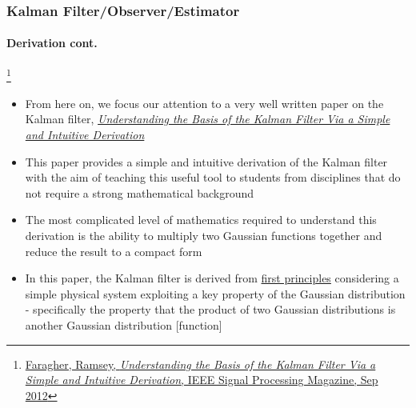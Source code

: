 \begin{frame}
\frametitle{Kalman Filter/Observer/Estimator}
\framesubtitle{Derivation \tiny cont.}

\footnote{\tiny\hspace{-0.23in} \href{http://www.cl.cam.ac.uk/~rmf25/papers/Understanding the Basis of the Kalman Filter.pdf}{Faragher, Ramsey, \emph{Understanding the Basis of the Kalman Filter Via a Simple and Intuitive Derivation}, IEEE Signal Processing Magazine, Sep 2012}}
\begin{itemize}\scriptsize
\item From here on, we focus our attention to a very well written paper on the Kalman filter,   \href{http://www.cl.cam.ac.uk/~rmf25/papers/Understanding the Basis of the Kalman Filter.pdf}{\color{blue} \emph{Understanding the Basis of the Kalman Filter Via a Simple and Intuitive Derivation}} 
\item This paper provides a simple and intuitive derivation of the Kalman filter with the aim of teaching this useful tool to students from disciplines that do not require a strong mathematical background
\item The most complicated level of mathematics required to understand this derivation is the ability to multiply two Gaussian functions together and reduce the result to a compact form
\item In this paper, the Kalman filter is derived from \underline{first principles} considering a simple physical system exploiting a key property of the Gaussian distribution - specifically the property that the product of two Gaussian distributions is another Gaussian distribution [function]
\end{itemize}
\end{frame}



